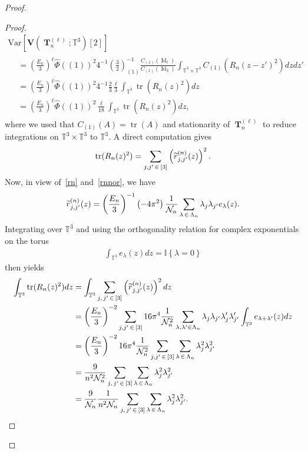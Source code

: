 \documentclass[AHL,Unicode,longabstracts,published]{cedram}
\DeclareMathOperator{\Id}{Id}
\DeclareMathOperator{\bT}{\mathbf{T}}
\DeclareMathOperator{\Tr}{tr}
\newcommand{\bfv}{\mathbf{V}}
\newcommand{\T}{\mathbb{T}^3}
\newcommand{\V}[1]{\mathrm{Var}{\left[#1\right]}}
\newcommand{\ind}[1]{\mathbb{I}
\left\{#1\right\}}
\newcommand{\Nn}{\mathcal{N}_n}
\let\oldtilde\tilde
\renewcommand*{\tilde}[1]{\mathchoice{\widetilde{#1}}{\widetilde{#1}}{\oldtilde{#1}}{\oldtilde{#1}}}
\begin{document}
\begin{proof}
\begin{proof}
\begin{multline}
\V{\bfv\left(\bT_n^{(\ell)};\T\right)[2]}\\
\begin{aligned}
&= \left(\frac{E_n}{3}\right)^{\ell} \widehat{\Phi}((1))^2 4^{-1}\left(\frac{3}{2}\right)_{(1)}^{-1}
\frac{C_{(1)}(\Id_{\ell})}{C_{(1)}(\Id_3)} \int_{\T\times \T} C_{(1)}\left(R_n(z-z')^2\right) dzdz'\\
&= \left(\frac{E_n}{3}\right)^{\ell} \widehat{\Phi}((1))^2 4^{-1}\frac{2}{3}\frac{\ell}{3} \int_{\T} \Tr\left(R_n(z)^2\right) dz\\
&= \left(\frac{E_n}{3}\right)^{\ell} \widehat{\Phi}((1))^2
\frac{\ell}{18} \int_{\T} \Tr\left(R_n(z)^2\right) dz,
\end{aligned}
\end{multline}
where we used that $C_{(1)}(A)=\Tr(A)$ and stationarity of $\bT_n^{(\ell)}$ to reduce integrations on $\T\times \T$ to $\T$. A direct computation gives
\begin{gather*}
\Tr(R_n(z)^2) = \sum_{j,j'\,\in\,[3]} \left(\tilde{r}^{(n)}_{j,j'}(z)\right)^2.
\end{gather*}
Now, in view of~\eqref{rn} and~\eqref{rnnor}, we have
\begin{gather*}
\tilde{r}^{(n)}_{j,j'}(z) = \left(\frac{E_n}{3}\right)^{-1} \left(-4\pi^2\right) \frac{1}{\Nn} \sum_{\lambda\,\in\,\Lambda_n} \lambda_j \lambda_{j'} e_{\lambda}(z).
\end{gather*}
Integrating over $\T$ and using the orthogonality relation for complex exponentials on the torus
\begin{gather}\label{ortoexp}
\int_{\T} e_{\lambda}(z) dz = \ind{\lambda=0}
\end{gather}
then yields
\begin{align*}
\int_{\T} \Tr(R_n(z)^2) dz
&=\int_{\T} \sum_{j,\,j'\,\in\,[3]} \left(\tilde{r}^{(n)}_{j,j'}(z)\right)^2 dz\\
&= \left(\frac{E_n}{3}\right)^{-2}
\sum_{j,j'\,\in\,[3]}16\pi^4 \frac{1}{\Nn^2}\sum_{\lambda, \lambda'\in \Lambda_n} \lambda_j \lambda_{j'} \lambda'_j \lambda'_{j'}\int_{\T } e_{\lambda+\lambda'}(z)dz\\
&= \left(\frac{E_n}{3}\right)^{-2}16\pi^4 \frac{1}{\Nn^2} \sum_{j,j'\,\in\,[3]}\sum_{\lambda\,\in\,\Lambda_n} \lambda_j^2 \lambda_{j'}^2\\ 
&= \frac{9}{n^2\Nn^2}\sum_{j,\,j'\,\in\,[3]}\sum_{\lambda\,\in\,\Lambda_n} \lambda_j^2 \lambda_{j'}^2 \\
&= \frac{9}{\Nn}\frac{1}{n^2\Nn}\sum_{j,\,j'\,\in\,[3]}\sum_{\lambda\,\in\,\Lambda_n} \lambda_j^2 \lambda_{j'}^2.

\end{align*}
\end{proof}
\end{proof}
\end{document}
